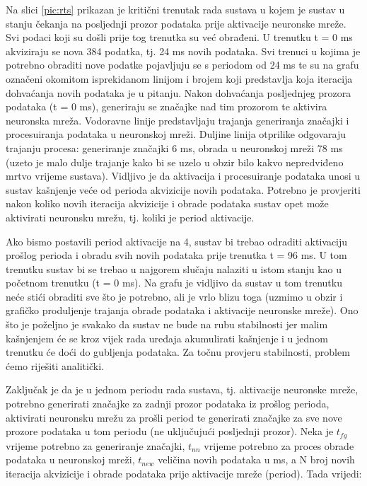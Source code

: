 Na slici \ref{pic:rts} prikazan je kritični trenutak rada sustava u kojem je sustav 
u stanju čekanja na posljednji prozor podataka prije aktivacije neuronske mreže. Svi
podaci koji su došli prije tog trenutka su već obrađeni. U trenutku t = 0 ms akviziraju se
nova 384 podatka, tj. 24 ms novih podataka. Svi trenuci u kojima je potrebno obraditi nove podatke
pojavljuju se s periodom od 24 ms te su na grafu označeni okomitom isprekidanom linijom i brojem
koji predstavlja koja iteracija dohvaćanja novih podataka je u pitanju. Nakon dohvaćanja
posljednjeg prozora podataka (t = 0 ms), generiraju se značajke nad tim prozorom te aktivira neuronska mreža.
Vodoravne linije predstavljaju trajanja
generiranja značajki i procesuiranja podataka u neuronskoj mreži. Duljine linija otprilike
odgovaraju trajanju procesa: generiranje značajki 6 ms, obrada u neuronskoj mreži 78 ms 
(uzeto je malo dulje trajanje kako bi se uzelo u obzir bilo kakvo nepredviđeno mrtvo vrijeme sustava).
Vidljivo je da aktivacija i procesuiranje podataka unosi u sustav kašnjenje veće od perioda
akvizicije novih podataka. Potrebno je provjeriti nakon koliko novih iteracija akvizicije i obrade
podataka sustav opet može aktivirati neuronsku mrežu, tj. koliki je period aktivacije.

Ako bismo postavili period aktivacije na 4, sustav bi trebao odraditi aktivaciju prošlog
perioda i obradu svih novih podataka prije trenutka t = 96 ms. U tom trenutku sustav bi se trebao
u najgorem slučaju nalaziti u istom stanju kao u početnom trenutku (t = 0 ms). Na grafu
je vidljivo da sustav u tom trenutku neće stići obraditi sve što je potrebno, ali je vrlo blizu
toga (uzmimo u obzir i grafičko produljenje trajanja obrade podataka i aktivacije neuronske mreže). 
Ono što je poželjno je svakako da sustav ne bude na rubu stabilnosti jer malim kašnjenjem će se
kroz vijek rada uređaja akumulirati kašnjenje i u jednom trenutku će doći do gubljenja podataka.
Za točnu provjeru stabilnosti, problem ćemo riješiti analitički.

Zaključak je da je u jednom periodu rada sustava, tj. aktivacije neuronske mreže, potrebno
generirati značajke za zadnji prozor podataka iz prošlog perioda, aktivirati neuronsku mrežu
za prošli period te generirati značajke za sve nove prozore podataka u tom periodu (ne uključujući
posljednji prozor).
Neka je $t_{fg}$ vrijeme potrebno za generiranje
značajki, $t_{nn}$ vrijeme potrebno za proces obrade podataka u neuronskoj mreži,
$t_{new}$ veličina novih podataka u ms, a N broj novih iteracija akvizicije i obrade podataka
prije aktivacije mreže (period). Tada vrijedi:

